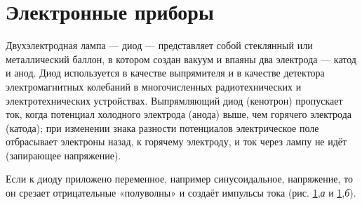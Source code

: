 \documentclass[a4paper,10pt]{book}
\begin{document}
\section{Электронные приборы}
Двухэлектродная лампа — диод — представляет собой стеклянный или металлический баллон, в котором создан вакуум и впаяны два электрода — катод и анод. Диод используется в качестве выпрямителя и в качестве детектора электромагнитных колебаний в многочисленных радиотехнических и электротехнических устройствах. Выпрямляющий диод (кенотрон) пропускает ток, когда потенциал холодного электрода (анода) выше, чем горячего электрода (катода); при изменении знака разности потенциалов электрическое поле отбрасывает электроны назад, к горячему электроду, и ток через лампу не идёт (запирающее напряжение).

Если к диоду приложено переменное, например синусоидальное, напряжение, то он срезает отрицательные «полуволны» и создаёт импульсы тока (рис. \ref{pic45},\textit{а} и \ref{pic45},\textit{б}).

\begin{figure}[h]
	\caption{}
	\label{pic45}
\end{figure}
\end{document}
